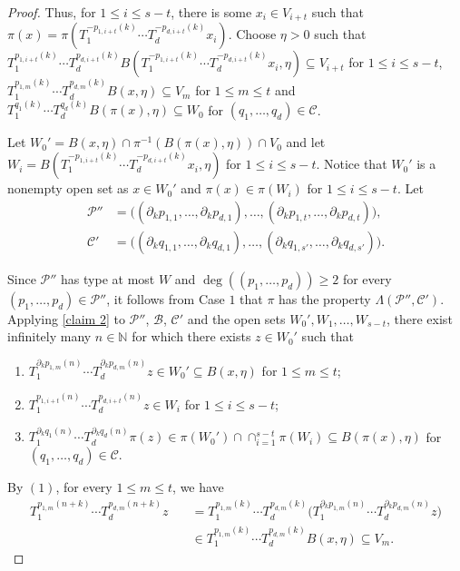 \documentclass[11pt,reqno]{amsart}
\newcommand{\N}{\mathbb{N}}
\newcommand{\cB}{{\mathcal B}}
\newcommand{\cC}{{\mathcal C}}
\newcommand{\cP}{{\mathcal P}}
\theoremstyle{definition}
\theoremstyle{remark}
\begin{document}
\begin{proof}
Thus, for $1\leq i\leq s-t$, there is some $x_i\in V_{i+t}$ such that $\pi(x) =\pi (T_{1}^{-p_{1,i+t}(k)}\cdots T_{d}^{-p_{d,i+t}(k)}x_i)$. Choose $\eta>0$ such that $T_{1}^{p_{1,i+t}(k)}\cdots T_{d}^{p_{d,i+t}(k)}B(T_{1}^{-p_{1,i+t}(k)}\cdots T_{d}^{-p_{d,i+t}(k)}x_i,\eta)\subseteq V_{i+t}$ for $1\leq i \leq s-t$, $T_{1}^{p_{1,m}(k)}\cdots T_{d}^{p_{d,m}(k)}B(x,\eta)\subseteq V_m$ for $1\leq m \leq t$ and $T_{1}^{q_1(k)}\cdots T_{d}^{q_d(k)}B(\pi(x),\eta)\subseteq W_0$ for $(q_1,\dots,q_d)\in\cC$.

Let $W_0' = B(x,\eta)\cap \pi^{-1}(B(\pi(x),\eta))\cap V_0$ and let $W_i = B(T_{1}^{-p_{1,i+t}(k)}\cdots T_{d}^{-p_{d,i+t}(k)}x_i,\eta)$ for $1\leq i \leq s-t$. Notice that $W_0'$ is a nonempty open set as $x\in W_0'$ and $\pi(x)\in \pi(W_i)$ for $1\leq i \leq s-t$. Let\begin{align*}
    \cP'' &= \big((\partial_k p_{1,1},\dots,\partial_k p_{d,1}),\dots,(\partial_k p_{1,t},\dots,\partial_k p_{d,t})\big),\\
    \cC' &= \big((\partial_k q_{1,1},\dots,\partial_k q_{d,1}),\dots,(\partial_k q_{1,s'},\dots,\partial_k q_{d,s'})\big).
\end{align*}

Since $\cP''$ has type at most $W$ and $\deg((p_1,\dots,p_d))\geq 2$ for every $(p_1,\dots,p_d)\in \cP''$, it follows from Case $1$ that $\pi$ has the property $\Lambda(\cP'',\cC')$. Applying \cref{claim 2} to $\cP''$, $\cB$, $\cC'$ and the open sets $W_0',W_1,\dots,W_{s-t}$, there exist infinitely many $n\in \N$  for which there exists $z\in W_0'$ such that \begin{enumerate}
    \item $T_{1}^{\partial_k p_{1,m}(n)}\cdots T_{d}^{\partial_k p_{d,m}(n)}z\in W_0'\subseteq B(x,\eta)$ for $1\leq m \leq t$;
    \item $T_{1}^{p_{1,i+t}(n)}\cdots T_{d}^{p_{d,i+t}(n)}z\in W_i$ for $1\leq i \leq s-t$;
    \item $T_{1}^{\partial_k q_1(n)}\cdots T_{d}^{\partial_k q_d(n)}\pi(z) \in \pi(W_0')\cap  \cap_{i=1}^{s-t}\pi(W_i)\subseteq B(\pi(x),\eta)$ for $(q_1,\dots,q_d)\in \cC$.
\end{enumerate}

By $(1)$, for every $1\leq m\leq t$, we have\begin{align*}
T_1^{p_{1,m}(n+k)}\cdots 
 T_d^{p_{d,m}(n+k)}z
&\quad =
T_1^{p_{1,m}(k)}\cdots 
T_d^{p_{d,m}(k)} 
\Big(
T_1^{\partial_{k}p_{1,m}(n)}\cdots 
T_d^{\partial_{k}p_{d,m}(n)}
z
\Big)                                        \\
&\quad \in
T_1^{p_{1,m}(k)}\cdots
T_d^{p_{d,m}(k)}
B(x,\eta)   \subseteq V_m.
\end{align*}


\end{proof}
\end{document}
